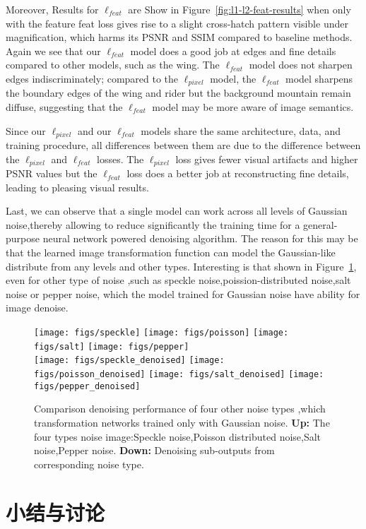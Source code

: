 Moreover, Results for $\ell_{feat}$ are Show in Figure~\ref{fig:l1-l2-feat-results} when only with the feature feat loss gives rise to a slight cross-hatch pattern visible under magnification, which harms its PSNR and SSIM compared to baseline methods. Again we see that our $\ell_{feat}$ model does a good job at edges and fine details compared to other models, such as the wing. The $\ell_{feat}$ model does not sharpen edges indiscriminately; compared to the $\ell_{pixel}$ model, the $\ell_{feat}$ model sharpens the boundary edges of the wing and rider but the background mountain remain diffuse, suggesting that the $\ell_{feat}$ model may be more aware of image semantics.

Since our $\ell_{pixel}$ and our $\ell_{feat}$ models share the same architecture, data, and training procedure, all differences between them are due to the difference between the $\ell_{pixel}$ and $\ell_{feat}$ losses. The $\ell_{pixel}$ loss gives fewer visual artifacts and higher PSNR values but the $\ell_{feat}$ loss does a better job at reconstructing fine details, leading to pleasing visual results.

Last, we can observe that a single model can work across all levels of Gaussian noise,thereby allowing to reduce significantly the training time for a general-purpose neural network powered denoising algorithm. The reason for this may be that the learned image transformation function can model the Gaussian-like distribute from any levels and other types. Interesting is that shown in Figure~\ref{fig:other-type-results},
even for other type of noise ,such as speckle noise,poission-distributed noise,salt noise or pepper noise, which the model trained for Gaussian noise have ability for image denoise.
   \begin{figure}[t]
 \centering
   \texttt{[image: figs/speckle]}
  \texttt{[image: figs/poisson]}
  \texttt{[image: figs/salt]}
  \texttt{[image: figs/pepper]} \\{}
  \texttt{[image: figs/speckle\_denoised]}
  \texttt{[image: figs/poisson\_denoised]}
  \texttt{[image: figs/salt\_denoised]}
  \texttt{[image: figs/pepper\_denoised]} \\
    
   \caption{Comparison denoising performance of four other noise types ,which  transformation networks trained only with Gaussian noise. \textbf{Up:} The four types noise image:Speckle noise,Poisson distributed noise,Salt noise,Pepper noise. \textbf{Down:} Denoising sub-outputs from corresponding noise type.
   }
   \vspace{-4mm}
   \label{fig:other-type-results}
 \end{figure}
 

\section{小结与讨论}

